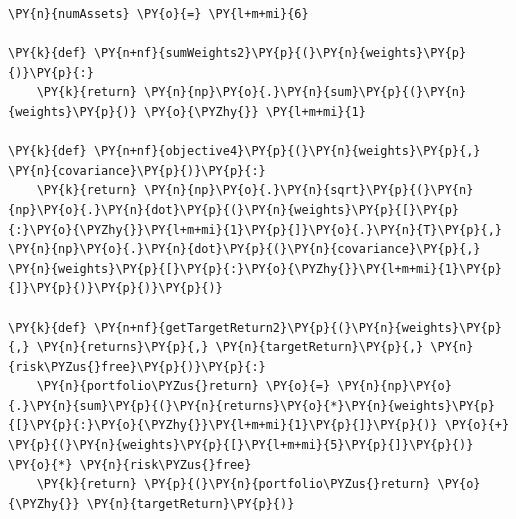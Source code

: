 \begin{tcolorbox}[breakable, size=fbox, boxrule=1pt, pad at break*=1mm,colback=cellbackground, colframe=cellborder]
\begin{Verbatim}[commandchars=\\\{\}]
\PY{n}{numAssets} \PY{o}{=} \PY{l+m+mi}{6}

\PY{k}{def} \PY{n+nf}{sumWeights2}\PY{p}{(}\PY{n}{weights}\PY{p}{)}\PY{p}{:}
    \PY{k}{return} \PY{n}{np}\PY{o}{.}\PY{n}{sum}\PY{p}{(}\PY{n}{weights}\PY{p}{)} \PY{o}{\PYZhy{}} \PY{l+m+mi}{1}

\PY{k}{def} \PY{n+nf}{objective4}\PY{p}{(}\PY{n}{weights}\PY{p}{,} \PY{n}{covariance}\PY{p}{)}\PY{p}{:}
    \PY{k}{return} \PY{n}{np}\PY{o}{.}\PY{n}{sqrt}\PY{p}{(}\PY{n}{np}\PY{o}{.}\PY{n}{dot}\PY{p}{(}\PY{n}{weights}\PY{p}{[}\PY{p}{:}\PY{o}{\PYZhy{}}\PY{l+m+mi}{1}\PY{p}{]}\PY{o}{.}\PY{n}{T}\PY{p}{,} \PY{n}{np}\PY{o}{.}\PY{n}{dot}\PY{p}{(}\PY{n}{covariance}\PY{p}{,} \PY{n}{weights}\PY{p}{[}\PY{p}{:}\PY{o}{\PYZhy{}}\PY{l+m+mi}{1}\PY{p}{]}\PY{p}{)}\PY{p}{)}\PY{p}{)}

\PY{k}{def} \PY{n+nf}{getTargetReturn2}\PY{p}{(}\PY{n}{weights}\PY{p}{,} \PY{n}{returns}\PY{p}{,} \PY{n}{targetReturn}\PY{p}{,} \PY{n}{risk\PYZus{}free}\PY{p}{)}\PY{p}{:}
    \PY{n}{portfolio\PYZus{}return} \PY{o}{=} \PY{n}{np}\PY{o}{.}\PY{n}{sum}\PY{p}{(}\PY{n}{returns}\PY{o}{*}\PY{n}{weights}\PY{p}{[}\PY{p}{:}\PY{o}{\PYZhy{}}\PY{l+m+mi}{1}\PY{p}{]}\PY{p}{)} \PY{o}{+} \PY{p}{(}\PY{n}{weights}\PY{p}{[}\PY{l+m+mi}{5}\PY{p}{]}\PY{p}{)} \PY{o}{*} \PY{n}{risk\PYZus{}free}
    \PY{k}{return} \PY{p}{(}\PY{n}{portfolio\PYZus{}return} \PY{o}{\PYZhy{}} \PY{n}{targetReturn}\PY{p}{)}


\end{Verbatim}
\end{tcolorbox}
